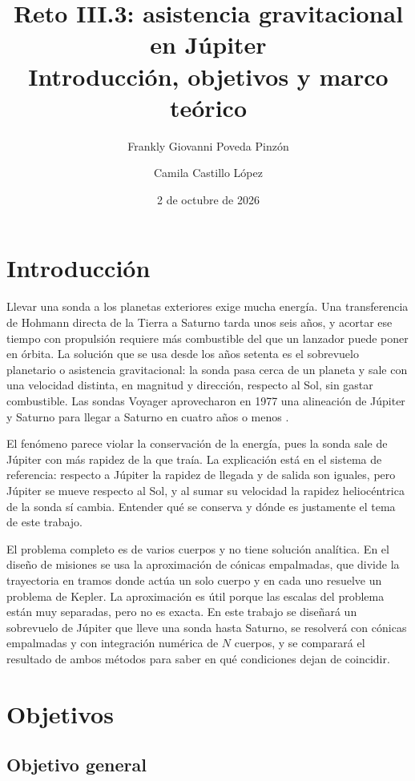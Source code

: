 \documentclass[12pt,letterpaper]{article}
\title{Reto III.3: asistencia gravitacional en Júpiter\\ Introducción, objetivos y marco teórico}
\author{Frankly Giovanni Poveda Pinzón \and Camila Castillo López}
\date{2 de octubre de 2026}
\begin{document}
\maketitle
\thispagestyle{empty}

\section{Introducción}

Llevar una sonda a los planetas exteriores exige mucha energía. Una transferencia de
Hohmann directa de la Tierra a Saturno tarda unos seis años, y acortar ese tiempo con
propulsión requiere más combustible del que un lanzador puede poner en órbita. La solución
que se usa desde los años setenta es el sobrevuelo planetario o asistencia gravitacional:
la sonda pasa cerca de un planeta y sale con una velocidad distinta, en magnitud y
dirección, respecto al Sol, sin gastar combustible. Las sondas Voyager aprovecharon en 1977
una alineación de Júpiter y Saturno para llegar a Saturno en cuatro años o menos
\cite{kohlhase1977}.

El fenómeno parece violar la conservación de la energía, pues la sonda sale de Júpiter con
más rapidez de la que traía. La explicación está en el sistema de referencia: respecto a
Júpiter la rapidez de llegada y de salida son iguales, pero Júpiter se mueve respecto al Sol,
y al sumar su velocidad la rapidez heliocéntrica de la sonda sí cambia. Entender qué se
conserva y dónde es justamente el tema de este trabajo.

El problema completo es de varios cuerpos y no tiene solución analítica. En el diseño de
misiones se usa la aproximación de cónicas empalmadas, que divide la trayectoria en tramos
donde actúa un solo cuerpo y en cada uno resuelve un problema de Kepler. La aproximación es
útil porque las escalas del problema están muy separadas, pero no es exacta. En este trabajo
se diseñará un sobrevuelo de Júpiter que lleve una sonda hasta Saturno, se resolverá con
cónicas empalmadas y con integración numérica de $N$ cuerpos, y se comparará el resultado de
ambos métodos para saber en qué condiciones dejan de coincidir.

\section{Objetivos}

\subsection*{Objetivo general}
\end{document}
